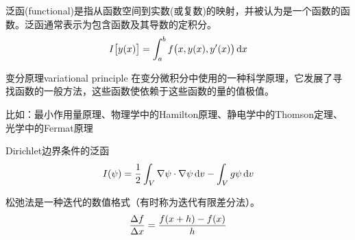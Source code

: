
泛函(functional)是指从函数空间到实数(或复数)的映射，并被认为是一个函数的函数。泛函通常表示为包含函数及其导数的定积分。
\begin{align}
    I\bigl[y(x)\bigr]=\int_a^bf\bigl(x,y(x),y'(x)\bigr)\mathop{}\!\mathrm{d} x
\end{align}
\begin{definition}{变分原理}{variational principle}
    在变分微积分中使用的一种科学原理，它发展了寻找函数的一般方法，这些函数使依赖于这些函数的量的值极值。

    比如：最小作用量原理、物理学中的Hamilton原理、静电学中的Thomson定理、光学中的Fermat原理
\end{definition}
Dirichlet边界条件的泛函
\[
    I(\psi)=\frac12\int_V\nabla\psi\cdot\nabla\psi\mathop{}\!\mathrm{d} v-\int_Vg\psi\mathop{}\!\mathrm{d} v
\]


松弛法是一种迭代的数值格式（有时称为迭代有限差分法）。
\[
    \frac{\Delta f}{\Delta x}=\frac{f(x+h)-f(x)}h
\]

